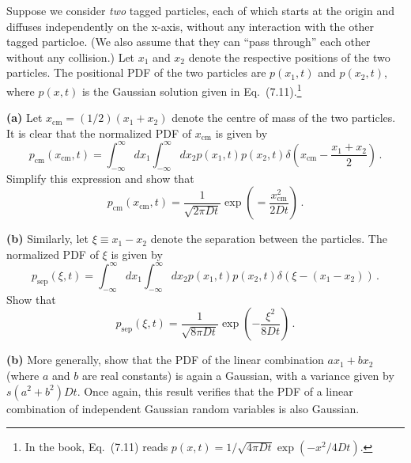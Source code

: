 

Suppose we consider \emph{two} tagged particles, each of which starts at the origin and diffuses independently on the x-axis, without any interaction with the other tagged particloe. (We also assume that they can ``pass through'' each other without any collision.) Let $x_1$ and $x_2$ denote the respective positions of the two particles.
The positional PDF of the two particles are $p(x_1, t)$ and $p(x_2, t)$, where $p(x, t)$ is the Gaussian solution given in Eq.~(7.11).\footnote{In the book, Eq.~(7.11) reads $p(x, t) = 1/\sqrt{4 \pi D t} \exp \left( -x^2 / 4 D t \right)$.}

\textbf{(a)} Let $x_\text{cm} = (1/2) (x_1 + x_2)$ denote the centre of mass of the two particles.
It is clear that the normalized PDF of $x_\text{cm}$ is given by
\begin{equation*}
  p_\text{cm}(x_\text{cm}, t) = \int_{-\infty}^\infty dx_1 \int_{-\infty}^\infty dx_2 p(x_1, t) p(x_2, t) \delta \left( x_\text{cm} - \frac{x_1 + x_2}{2} \right)
  \, .
\end{equation*}
Simplify this expression and show that
\begin{equation*}
  p_\text{cm}(x_\text{cm}, t) = \frac{1}{\sqrt{2 \pi D t}} \exp \left( = \frac{x_\text{cm}^2}{2 D t} \right)
  \, .
\end{equation*}

\textbf{(b)} Similarly, let $\xi \equiv x_1 - x_2$ denote the separation between the particles.
The normalized PDF of $\xi$ is given by
\begin{equation*}
  p_\text{sep}(\xi, t) = \int_{-\infty}^\infty dx_1 \int_{-\infty}^\infty dx_2 p(x_1, t) p(x_2, t) \delta \left( \xi - (x_1 - x_2) \right)
  \, .
\end{equation*}
Show that
\begin{equation*}
  p_\text{sep}(\xi, t) = \frac{1}{\sqrt{8 \pi D t}} \exp \left( - \frac{\xi^2}{8 D t} \right)
  \, .
\end{equation*}

\textbf{(b)} More generally, show that the PDF of the linear combination $ax_1 + b x_2$ (where $a$ and $b$ are real constants) is again a Gaussian, with a variance given by $s(a^2 + b^2)Dt$.
Once again, this result verifies that the PDF of a linear combination of independent Gaussian random variables is also Gaussian.


